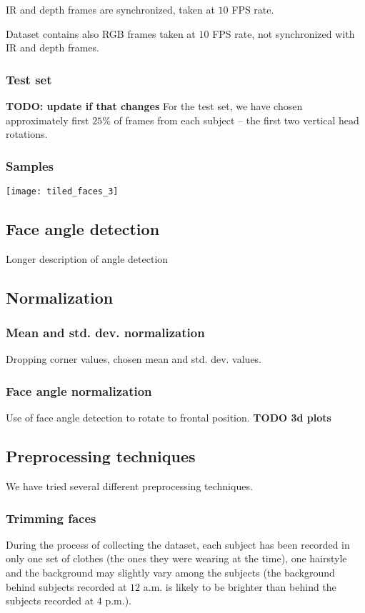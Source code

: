     IR and depth frames are synchronized, taken at $10$ FPS rate.

    Dataset contains also RGB frames taken at $10$ FPS rate, not synchronized
    with IR and depth frames.

    \subsubsection*{Test set}
    \textbf{TODO: update if that changes}
    For the test set, we have chosen approximately first $25\%$ of
    frames from each subject -- the first two vertical head rotations.

    \subsubsection*{Samples}
    \texttt{[image: tiled\_faces\_3]}

    \subsection{Face angle detection}
    Longer description of angle detection

    \subsection{Normalization}
        \subsubsection*{Mean and std. dev. normalization}
        Dropping corner values, chosen mean and std. dev. values.

        \subsubsection*{Face angle normalization}
        Use of face angle detection to rotate to frontal position.
        \textbf{TODO 3d plots}

    \subsection{Preprocessing techniques}
    We have tried several different preprocessing techniques.
        \subsubsection*{Trimming faces}
        During the process of collecting the dataset, each subject has been
        recorded in only one set of clothes (the ones they were wearing at the
        time), one hairstyle and the background may slightly vary among the
        subjects (the background behind subjects recorded at $12$ a.m. is
        likely to be brighter than behind the subjects recorded at $4$ p.m.).

